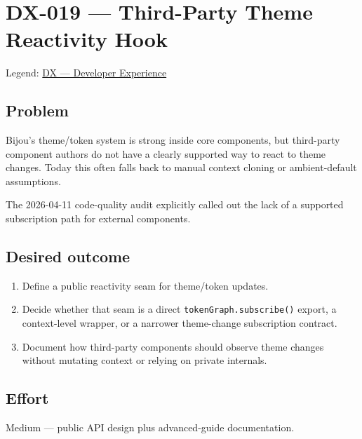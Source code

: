 \chapter{DX-019 --- Third-Party Theme Reactivity Hook}\label{record-329}

\smallskip

Legend: \href{https://github.com/flyingrobots/bijou/blob/cbd70612140e7a450d764b3c7be1c6af878b99bc/docs/method/graveyard/legends/DX-developer-experience.md}{DX --- Developer Experience}

\section{Problem}\label{record-329-problem}

Bijou's theme/token system is strong inside core components, but third-party component authors do not have a clearly supported way to react to theme changes. Today this often falls back to manual context cloning or ambient-default assumptions.

The 2026-04-11 code-quality audit explicitly called out the lack of a supported subscription path for external components.

\section{Desired outcome}\label{record-329-desired-outcome}

\begin{enumerate}
\def\labelenumi{\arabic{enumi}.}
\tightlist
\item
  Define a public reactivity seam for theme/token updates.
\item
  Decide whether that seam is a direct \texttt{t\allowbreak{}o\allowbreak{}k\allowbreak{}e\allowbreak{}n\allowbreak{}G\allowbreak{}r\allowbreak{}a\allowbreak{}p\allowbreak{}h\allowbreak{}.\allowbreak{}s\allowbreak{}u\allowbreak{}b\allowbreak{}s\allowbreak{}c\allowbreak{}r\allowbreak{}i\allowbreak{}b\allowbreak{}e\allowbreak{}(\allowbreak{})} export, a context-level wrapper, or a narrower theme-change subscription contract.
\item
  Document how third-party components should observe theme changes without mutating context or relying on private internals.
\end{enumerate}

\section{Effort}\label{record-329-effort}

Medium --- public API design plus advanced-guide documentation.

